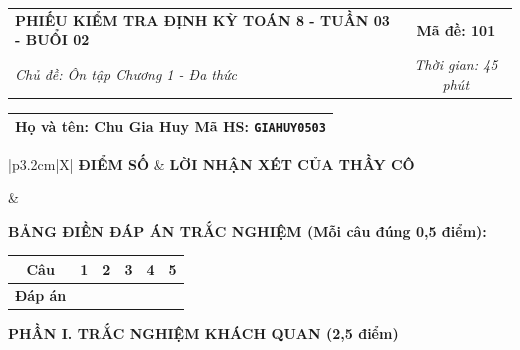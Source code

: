 \documentclass[12pt,a4paper]{article}
\begin{document}
\pagestyle{empty}



\noindent
\begin{tabularx}{\linewidth}{|X|c|}
\hline
\textbf{PHIẾU KIỂM TRA ĐỊNH KỲ TOÁN 8 - TUẦN 03 - BUỔI 02} & \textbf{Mã đề: 101} \\
\textit{Chủ đề: Ôn tập Chương 1 - Đa thức} & \textit{Thời gian: 45 phút} \\
\hline
\end{tabularx}

\vspace{1mm}

\noindent
\begin{tabularx}{\linewidth}{|X|}
\hline
\rule[-2mm]{0pt}{7.5mm}\textbf{Họ và tên:} \textbf{\large Chu Gia Huy} \hfill \textbf{Mã HS:} \texttt{GIAHUY0503} \quad \\
\hline
\end{tabularx}

\vspace{1mm}

\noindent
\begin{tabularx}{\linewidth}{|p{3.2cm}|X|}
\hline
\centering\textbf{ĐIỂM SỐ} & \centering\textbf{LỜI NHẬN XÉT CỦA THẦY CÔ} \tabularnewline
\hline
\rule{0pt}{1.3cm} & \tabularnewline
\hline
\end{tabularx}

\vspace{1.2mm}

\noindent\textbf{BẢNG ĐIỀN ĐÁP ÁN TRẮC NGHIỆM (Mỗi câu đúng 0,5 điểm):}
\vspace{0.8mm}

\noindent
\renewcommand{\arraystretch}{1.35}
\begin{tabularx}{\linewidth}{|c|*{5}{>{\centering\arraybackslash}X|}}
\hline
\textbf{Câu} & \textbf{1} & \textbf{2} & \textbf{3} & \textbf{4} & \textbf{5} \\
\hline
\textbf{Đáp án} & & & & & \\
\hline
\end{tabularx}
\renewcommand{\arraystretch}{1.0}

\vspace{1.5mm}

\noindent\textbf{\large PHẦN I. TRẮC NGHIỆM KHÁCH QUAN (2,5 điểm)}
\vspace{1mm}
\end{document}
